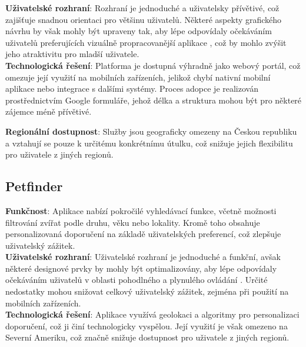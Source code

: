 \documentclass[czech, bp, kiv, he, iso690numb, pdf]{fasthesis}
\begin{document}
    \noindent\textbf{Uživatelské rozhraní}: Rozhraní je jednoduché a uživatelsky přívětivé, což zajišťuje snadnou orientaci pro většinu uživatelů. Některé aspekty grafického návrhu by však mohly být upraveny tak, aby lépe odpovídaly očekáváním uživatelů preferujících vizuálně propracovanější aplikace \cite{fluffy}\cite{petfood}, což by mohlo zvýšit jeho atraktivitu pro mladší uživatele.\\

    \noindent\textbf{Technologická řešení}: Platforma je dostupná výhradně jako webový portál, což omezuje její využití na mobilních zařízeních, jelikož chybí nativní mobilní aplikace nebo integrace s dalšími systémy. Proces adopce je realizován prostřednictvím Google formuláře, jehož délka a struktura mohou být pro některé zájemce méně přívětivé.\\

    \newpage

    \noindent \textbf{Regionální dostupnost}: Služby jsou geograficky omezeny na Českou republiku a vztahují se pouze k určitému konkrétnímu útulku, což snižuje jejich flexibilitu pro uživatele z jiných regionů.\\


    \subsection{Petfinder}

    \noindent \textbf{Funkčnost}: Aplikace nabízí pokročilé vyhledávací funkce, včetně možnosti filtrování zvířat podle druhu, věku nebo lokality. Kromě toho obsahuje personalizovaná doporučení na základě uživatelských preferencí, což zlepšuje uživatelský zážitek.\\

    \noindent \textbf{Uživatelské rozhraní}: Uživatelské rozhraní je jednoduché a funkční, avšak některé designové prvky by mohly být optimalizovány, aby lépe odpovídaly očekáváním uživatelů v oblasti pohodlného a plynulého ovládání \cite{fluffy}\cite{petfood}. Určité nedostatky mohou snižovat celkový uživatelský zážitek, zejména při použití na mobilních zařízeních.\\

    \noindent \textbf{Technologická řešení}: Aplikace využívá geolokaci a algoritmy pro personalizaci doporučení, což ji činí technologicky vyspělou. Její využití je však omezeno na Severní Ameriku, což značně snižuje dostupnost pro uživatele z jiných regionů.\\
\end{document}

